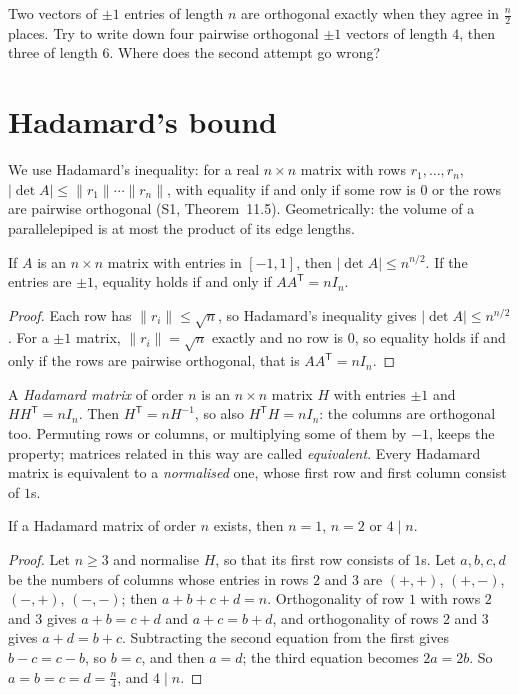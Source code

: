 \begin{think}
Two vectors of $\pm1$ entries of length $n$ are orthogonal exactly when they agree in $\frac n2$ places. Try to write down four pairwise orthogonal
$\pm1$ vectors of length $4$, then three of length $6$. Where does the second attempt go wrong?
\end{think}

\section{Hadamard's bound}

We use Hadamard's inequality: for a real $n\times n$ matrix with rows $r_1,\dots,r_n$, $|\det A|\le\|r_1\|\cdots\|r_n\|$, with equality if and only if
some row is $0$ or the rows are pairwise orthogonal (S1, Theorem~11.5). Geometrically: the volume of a parallelepiped is at most the product of its
edge lengths.

\begin{theorem}[Hadamard, 1893]\label{thm:hadbound}
If $A$ is an $n\times n$ matrix with entries in $[-1,1]$, then $|\det A|\le n^{n/2}$. If the entries are $\pm1$, equality holds if and only if
$AA^{\mathsf T}=nI_n$.
\end{theorem}
\begin{proof}
Each row has $\|r_i\|\le\sqrt n$, so Hadamard's inequality gives $|\det A|\le n^{n/2}$. For a $\pm1$ matrix, $\|r_i\|=\sqrt n$ exactly and no row is $0$,
so equality holds if and only if the rows are pairwise orthogonal, that is $AA^{\mathsf T}=nI_n$.
\end{proof}

A \emph{Hadamard matrix} of order $n$ is an $n\times n$ matrix $H$ with entries $\pm1$ and $HH^{\mathsf T}=nI_n$. Then $H^{\mathsf T}=nH^{-1}$, so also
$H^{\mathsf T}H=nI_n$: the columns are orthogonal too. Permuting rows or columns, or multiplying some of them by $-1$, keeps the property; matrices related
in this way are called \emph{equivalent}. Every Hadamard matrix is equivalent to a \emph{normalised} one, whose first row and first column consist of $1$s.

\begin{proposition}\label{prop:div4}
If a Hadamard matrix of order $n$ exists, then $n=1$, $n=2$ or $4\mid n$.
\end{proposition}
\begin{proof}
Let $n\ge3$ and normalise $H$, so that its first row consists of $1$s. Let $a,b,c,d$ be the numbers of columns whose entries in rows $2$ and $3$ are
$(+,+)$, $(+,-)$, $(-,+)$, $(-,-)$; then $a+b+c+d=n$. Orthogonality of row $1$ with rows $2$ and $3$ gives $a+b=c+d$ and $a+c=b+d$, and orthogonality
of rows $2$ and $3$ gives $a+d=b+c$. Subtracting the second equation from the first gives $b-c=c-b$, so $b=c$, and then $a=d$; the third equation
becomes $2a=2b$. So $a=b=c=d=\frac n4$, and $4\mid n$.
\end{proof}

